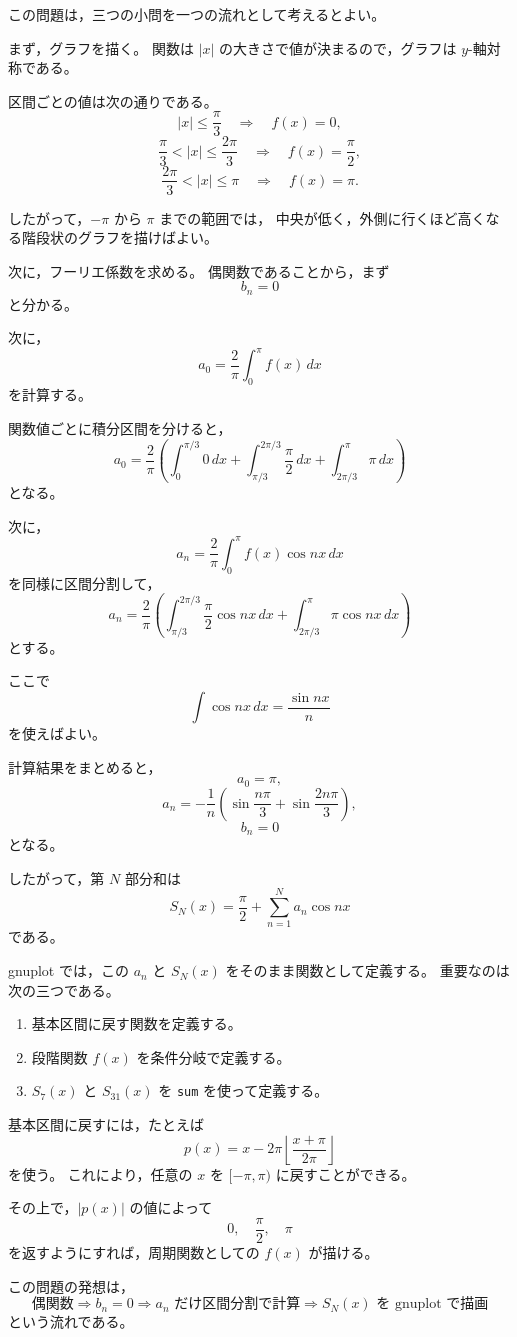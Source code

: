\begin{strategy}
	この問題は，三つの小問を一つの流れとして考えるとよい。
	
	まず，グラフを描く。
	関数は \(|x|\) の大きさで値が決まるので，グラフは \(y\)-軸対称である。
	
	区間ごとの値は次の通りである。
	\[
	|x|\leq \frac{\pi}{3}
	\quad\Longrightarrow\quad
	f(x)=0,
	\]
	\[
	\frac{\pi}{3}<|x|\leq \frac{2\pi}{3}
	\quad\Longrightarrow\quad
	f(x)=\frac{\pi}{2},
	\]
	\[
	\frac{2\pi}{3}<|x|\leq \pi
	\quad\Longrightarrow\quad
	f(x)=\pi.
	\]
	
	したがって，\(-\pi\) から \(\pi\) までの範囲では，
	中央が低く，外側に行くほど高くなる階段状のグラフを描けばよい。
	
	次に，フーリエ係数を求める。
	偶関数であることから，まず
	\[
	b_n=0
	\]
	と分かる。
	
	次に，
	\[
	a_0=\frac{2}{\pi}\int_0^\pi f(x)\,dx
	\]
	を計算する。
	
	関数値ごとに積分区間を分けると，
	\[
	a_0
	=
	\frac{2}{\pi}
	\left(
	\int_0^{\pi/3}0\,dx
	+
	\int_{\pi/3}^{2\pi/3}\frac{\pi}{2}\,dx
	+
	\int_{2\pi/3}^{\pi}\pi\,dx
	\right)
	\]
	となる。
	
	次に，
	\[
	a_n=\frac{2}{\pi}\int_0^\pi f(x)\cos nx\,dx
	\]
	を同様に区間分割して，
	\[
	a_n
	=
	\frac{2}{\pi}
	\left(
	\int_{\pi/3}^{2\pi/3}\frac{\pi}{2}\cos nx\,dx
	+
	\int_{2\pi/3}^{\pi}\pi\cos nx\,dx
	\right)
	\]
	とする。
	
	ここで
	\[
	\int \cos nx\,dx=\frac{\sin nx}{n}
	\]
	を使えばよい。
	
	計算結果をまとめると，
	\[
	a_0=\pi,
	\]
	\[
	a_n
	=
	-\frac{1}{n}
	\left(
	\sin\frac{n\pi}{3}
	+
	\sin\frac{2n\pi}{3}
	\right),
	\]
	\[
	b_n=0
	\]
	となる。
	
	したがって，第 \(N\) 部分和は
	\[
	S_N(x)
	=
	\frac{\pi}{2}
	+
	\sum_{n=1}^{N}
	a_n\cos nx
	\]
	である。
	
	gnuplot では，この \(a_n\) と \(S_N(x)\) をそのまま関数として定義する。
	重要なのは次の三つである。
	
	\begin{enumerate}
		\item 基本区間に戻す関数を定義する。
		\item 段階関数 \(f(x)\) を条件分岐で定義する。
		\item \(S_7(x)\) と \(S_{31}(x)\) を \texttt{sum} を使って定義する。
	\end{enumerate}
	
	基本区間に戻すには，たとえば
	\[
	p(x)=x-2\pi\left\lfloor\frac{x+\pi}{2\pi}\right\rfloor
	\]
	を使う。
	これにより，任意の \(x\) を \([-\pi,\pi)\) に戻すことができる。
	
	その上で，\(|p(x)|\) の値によって
	\[
	0,\quad \frac{\pi}{2},\quad \pi
	\]
	を返すようにすれば，周期関数としての \(f(x)\) が描ける。
	
	この問題の発想は，
	\[
	\text{偶関数}
	\Rightarrow
	b_n=0
	\Rightarrow
	a_n\text{ だけ区間分割で計算}
	\Rightarrow
	S_N(x)\text{ を gnuplot で描画}
	\]
	という流れである。
\end{strategy}